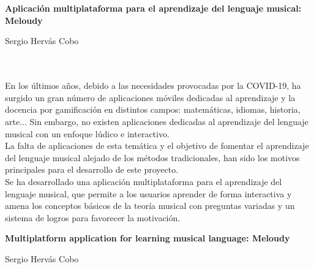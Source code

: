 \chapter*{}


\thispagestyle{empty}

\begin{center}
{\large\bfseries Aplicación multiplataforma para el aprendizaje del lenguaje musical: Meloudy}\\
\end{center}
\begin{center}
Sergio Hervás Cobo\\
\end{center}

\\

\vspace{0.7cm}
\\
En los últimos años, debido a las necesidades provocadas por la COVID-19, ha surgido un gran número de aplicaciones móviles dedicadas al aprendizaje y la docencia por gamificación en distintos campos: matemáticas, idiomas, historia, arte... Sin embargo, no existen aplicaciones dedicadas al aprendizaje del lenguaje musical con un enfoque lúdico e interactivo.\\

La falta de aplicaciones de esta temática y el objetivo de fomentar el aprendizaje del lenguaje musical alejado de los métodos tradicionales, han sido los motivos principales para el desarrollo de este proyecto.\\

Se ha desarrollado una aplicación multiplataforma para el aprendizaje del lenguaje musical, que permite a los usuarios aprender de forma interactiva y amena los conceptos básicos de la teoría musical con preguntas variadas y un sistema de logros para favorecer la motivación.

\cleardoublepage


\thispagestyle{empty}


\begin{center}
{\large\bfseries Multiplatform application for learning musical language: Meloudy }\\
\end{center}
\begin{center}
Sergio Hervás Cobo\\
\end{center}

